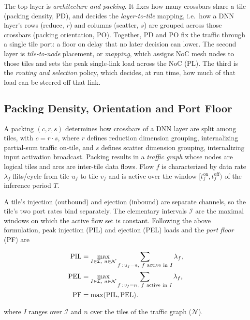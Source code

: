 The top layer is \emph{architecture and packing}. It fixes how many crossbars share a tile (packing density, PD), and decides the \emph{layer-to-tile} mapping, i.e.\ how a DNN layer's rows (reduce, $r$) and columns (scatter, $s$) are grouped across those crossbars (packing orientation, PO). Together, PD and PO fix the traffic through a single tile port: a floor on delay that no later decision can lower. The second layer is \emph{tile-to-node} placement, or \emph{mapping}, which assigns NoC mesh nodes to those tiles and sets the peak single-link load across the NoC (PL). The third is the \emph{routing and selection} policy, which decides, at run time, how much of that load can be steered off that link.

\subsection{Packing Density, Orientation and Port Floor}
\label{sec:packing}
A packing $(c,r,s)$ determines how crossbars of a DNN layer are split among tiles, with $c=r\cdot s$, where $r$ defines reduction dimension grouping, internalizing partial-sum traffic on-tile, and $s$ defines scatter dimension grouping, internalizing input activation broadcast. Packing results in a \emph{traffic graph} whose nodes
are logical tiles and arcs are inter-tile data flows. Flow $f$ is characterized by data rate $\lambda_f$
flits/cycle from tile $u_f$ to tile $v_f$ and is active over the window
$[t^{\mathrm{on}}_f, t^{\mathrm{off}}_f)$ of the inference period $T$. 

A tile's injection (outbound) and ejection (inbound) are separate channels, so the tile's two port rates bind separately. The elementary intervals $\mathcal{I}$ are the
maximal windows on which the active flow set is constant. Following the above formulation, peak injection (PIL) and
ejection (PEL) loads and the \emph{port floor} (PF) are

\begin{align}
  \mathrm{PIL} &= \max_{I\in\mathcal{I},\ n\in\mathcal{N}}
    \sum_{f\,:\,u_f=n,\ f\ \mathrm{active}\ \mathrm{in}\ I} \lambda_f,
  \label{eq:pil}\\
  \mathrm{PEL} &= \max_{I\in\mathcal{I},\ n\in\mathcal{N}}
    \sum_{f\,:\,v_f=n,\ f\ \mathrm{active}\ \mathrm{in}\ I} \lambda_f,
  \label{eq:pel}\\
  \mathrm{PF} &= \max(\mathrm{PIL},\mathrm{PEL}).
  \label{eq:pf}
\end{align}

where $I$ ranges over $\mathcal{I}$ and $n$ over the tiles of the traffic graph ($\mathcal{N}$).

